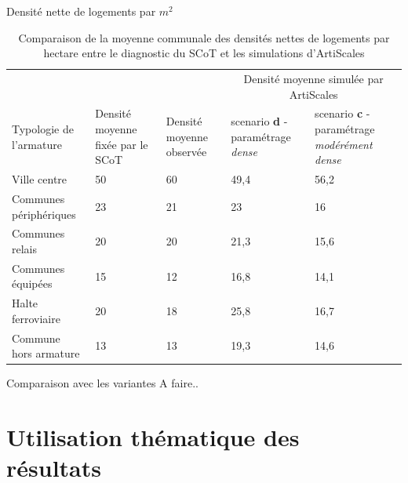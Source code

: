 \documentclass[xcolor=table]{beamer}
\begin{document}
\begin{frame}{Densité nette de logements par $m^{2}$}
\begin{table}[h]
	{\footnotesize \caption{Comparaison de la moyenne communale des densités nettes de logements par hectare entre le diagnostic du SCoT et les simulations d'ArtiScales}
}	\tiny 
	\begin{center}
		\begin{tabular}{m{2.5cm}m{1.5cm}m{1.3cm}m{2cm}m{2cm}}
			\toprule
			&&&\multicolumn{2}{c}{Densité moyenne simulée par ArtiScales} \\
			Typologie de l'armature &
			Densité moyenne fixée par le SCoT &
			Densité moyenne observée&
			scenario \textbf{d} - paramétrage \textit{dense} &
			scenario \textbf{c} - paramétrage \textit{modérément dense} \\ \hline
			Ville centre&50&60&49,4&56,2\\ \hline
			Communes périphériques&23&21&23&16\\ \hline
			Communes relais &20&20&21,3&15,6\\ \hline
			Communes équipées&15&12&16,8&14,1\\ \hline
			Halte ferroviaire&20&18&25,8&16,7 \\ \hline
			Commune hors armature&13&13&19,3 &14,6\\ \hline
		\end{tabular}
	\end{center}
\end{table}
\end{frame}

\begin{frame}{Comparaison avec les variantes}
A faire..
\end{frame}

\section{Utilisation thématique des résultats}
\end{document}
